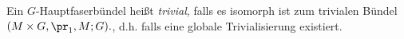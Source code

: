 \documentclass[%
	paper=a5,%
	fleqn,%
	DIV=18,%
	BCOR=0mm,
	fontsize=11pt,
	titlepage=false,%
	bibliography=totoc,
	DIV=18,%
	twoside=true,
	pdftitle=Riemannsche Geometrie,
	pdfauthor=Uwe Semmelmann,
	numbers=noendperiod]%
	{scrbook}
\begin{document}
\begin{rem}
Ein $G$-Hauptfaserbündel heißt \emph{trivial}, falls es isomorph ist zum
trivialen Bündel
$
(M\times G,\pr_1,M;G).
$, d.h. falls eine globale Trivialisierung existiert.

\end{rem}
\end{document}

